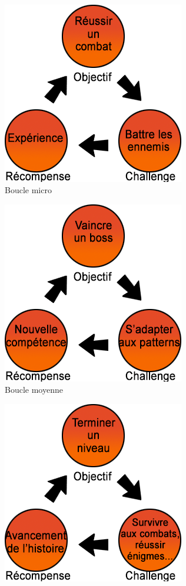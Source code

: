 \documentclass{report}
\begin{document}
\paragraph{}
\begin{figure}
\begin{adjustwidth}{-8em}{-7em}
\begin{subfigure}{.5\textwidth}
  \includegraphics[scale=0.5]{DATA/boucleMicro.png}
  \caption{Boucle micro}
  \label{fig:sfig1}
\end{subfigure}%
\begin{subfigure}{.5\textwidth}
  \centering
  \includegraphics[scale=0.5]{DATA/boucleMoyene.png}
  \caption{Boucle moyenne}
  \label{fig:sfig2}
\end{subfigure}
\begin{subfigure}{.5\textwidth}
  \centering
  \includegraphics[scale=0.5]{DATA/boucleMacro.png}

\end{subfigure}
\end{adjustwidth}
\end{figure}
\end{document}
